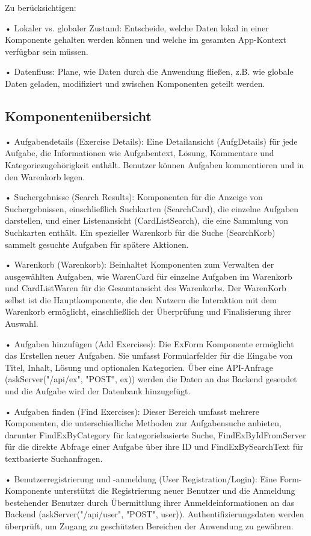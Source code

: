 \documentclass[12pt,a4paper]{article} %
\begin{document}
Zu berücksichtigen:

•	Lokaler vs. globaler Zustand: Entscheide, welche Daten lokal in einer Komponente gehalten werden können und welche im gesamten App-Kontext verfügbar sein müssen.

•	Datenfluss: Plane, wie Daten durch die Anwendung fließen, z.B. wie globale Daten geladen, modifiziert und zwischen Komponenten geteilt werden.


\subsection{Komponentenübersicht}

•	Aufgabendetails (Exercise Details): Eine Detailansicht (AufgDetails) für jede Aufgabe, die Informationen wie Aufgabentext, Lösung, Kommentare und Kategoriezugehörigkeit enthält. Benutzer können Aufgaben kommentieren und in den Warenkorb legen.

•	Suchergebnisse (Search Results): Komponenten für die Anzeige von Suchergebnissen, einschließlich Suchkarten (SearchCard), die einzelne Aufgaben darstellen, und einer Listenansicht (CardListSearch), die eine Sammlung von Suchkarten enthält. Ein spezieller Warenkorb für die Suche (SearchKorb) sammelt gesuchte Aufgaben für spätere Aktionen.

•	Warenkorb (Warenkorb): Beinhaltet Komponenten zum Verwalten der ausgewählten Aufgaben, wie WarenCard für einzelne Aufgaben im Warenkorb und CardListWaren für die Gesamtansicht des Warenkorbs. Der WarenKorb selbst ist die Hauptkomponente, die den Nutzern die Interaktion mit dem Warenkorb ermöglicht, einschließlich der Überprüfung und Finalisierung ihrer Auswahl.

•	Aufgaben hinzufügen (Add Exercises): Die ExForm Komponente ermöglicht das Erstellen neuer Aufgaben. 
Sie umfasst Formularfelder für die Eingabe von Titel, Inhalt, Lösung und optionalen Kategorien. Über eine API-Anfrage 
(askServer("/api/ex", "POST", ex)) werden die Daten an das Backend gesendet und die Aufgabe wird der Datenbank hinzugefügt.

•	Aufgaben finden (Find Exercises): Dieser Bereich umfasst mehrere Komponenten, die unterschiedliche Methoden zur Aufgabensuche anbieten, darunter FindExByCategory für kategoriebasierte Suche, FindExByIdFromServer für die direkte Abfrage einer Aufgabe über ihre ID und FindExBySearchText für textbasierte Suchanfragen.

•	Benutzerregistrierung und -anmeldung (User Registration/Login): Eine Form-Komponente unterstützt die Registrierung neuer Benutzer und die Anmeldung bestehender Benutzer durch Übermittlung ihrer Anmeldeinformationen an das Backend (askServer("/api/user", "POST", user)).
    Authentifizierungsdaten werden überprüft, um Zugang zu geschützten Bereichen der Anwendung zu gewähren.
\end{document}
